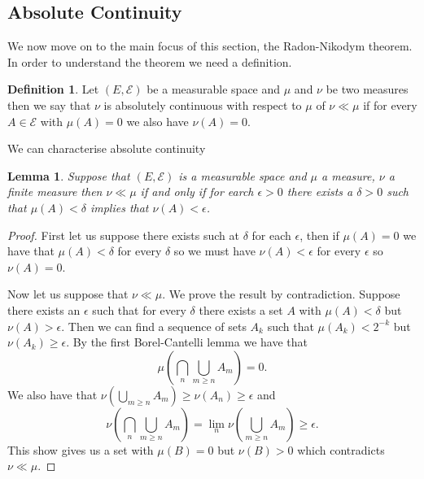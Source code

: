 \documentclass[11pt]{article}
\newtheorem{lem}[thm]{Lemma}
\theoremstyle{definition}
\newtheorem{dfn}[thm]{Definition}
\theoremstyle{remark}
\begin{document}
\subsection{Absolute Continuity}
We now move on to the main focus of this section, the Radon-Nikodym theorem. In order to understand the theorem we need a definition.
\begin{dfn}
Let $(E, \mathcal{E})$ be a measurable space and $\mu$ and $\nu$ be two measures then we say that $\nu$ is absolutely continuous with respect to $\mu$ of $\nu \ll \mu$ if for every $A \in \mathcal{E}$ with $\mu(A) = 0$ we also have $\nu(A) = 0$.
\end{dfn}
We can characterise absolute continuity
\begin{lem}
Suppose that $(E, \mathcal{E})$ is a measurable space and $\mu$ a measure, $\nu$ a finite measure then $\nu \ll \mu$ if and only if for earch $\epsilon >0$ there exists a $\delta>0$ such that $\mu(A) < \delta$ implies that $\nu(A) < \epsilon$. 
\end{lem}
\begin{proof}
First let us suppose there exists such at $\delta$ for each $\epsilon$, then if $\mu(A) = 0$ we have that $\mu(A)< \delta$ for every $\delta$ so we must have $\nu(A) < \epsilon$ for every $\epsilon$ so $\nu(A) =0$.

Now let us suppose that $\nu \ll \mu$. We prove the result by contradiction. Suppose there exists an $\epsilon$ such that for every $\delta$ there exists a set $A$ with $\mu(A)< \delta$ but $\nu(A) >\epsilon$. Then we can find a sequence of sets $A_k$ such that $\mu(A_k) < 2^{-k}$ but $\nu(A_k) \geq \epsilon$. By the first Borel-Cantelli lemma we have that
\[ \mu \left( \bigcap_n \bigcup_{m \geq n} A_m \right) = 0. \] We also have that $\nu(\bigcup_{m \geq n} A_m) \geq \nu(A_n) \geq \epsilon$ and
\[\nu \left( \bigcap_n \bigcup_{m \geq n} A_m\right) = \lim_n \nu \left( \bigcup_{m \geq n} A_m \right) \geq \epsilon. \] This show gives us a set with $\mu(B) = 0$ but $\nu(B) > 0$ which contradicts $\nu \ll \mu$.
\end{proof}
\end{document}
